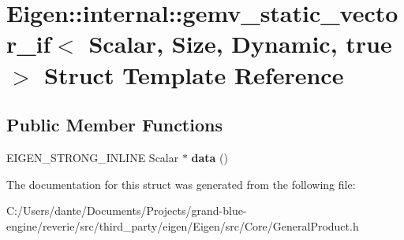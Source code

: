 \hypertarget{struct_eigen_1_1internal_1_1gemv__static__vector__if_3_01_scalar_00_01_size_00_01_dynamic_00_01true_01_4}{}\section{Eigen\+::internal\+::gemv\+\_\+static\+\_\+vector\+\_\+if$<$ Scalar, Size, Dynamic, true $>$ Struct Template Reference}
\label{struct_eigen_1_1internal_1_1gemv__static__vector__if_3_01_scalar_00_01_size_00_01_dynamic_00_01true_01_4}
\subsection*{Public Member Functions}
\begin{DoxyCompactItemize}
\item 
\mbox{\label{struct_eigen_1_1internal_1_1gemv__static__vector__if_3_01_scalar_00_01_size_00_01_dynamic_00_01true_01_4_a70bb966a3697166cc95904af768d23fd}} 
E\+I\+G\+E\+N\+\_\+\+S\+T\+R\+O\+N\+G\+\_\+\+I\+N\+L\+I\+NE Scalar $\ast$ {\bfseries data} ()
\end{DoxyCompactItemize}


The documentation for this struct was generated from the following file\+:\begin{DoxyCompactItemize}
\item 
C\+:/\+Users/dante/\+Documents/\+Projects/grand-\/blue-\/engine/reverie/src/third\+\_\+party/eigen/\+Eigen/src/\+Core/General\+Product.\+h\end{DoxyCompactItemize}

